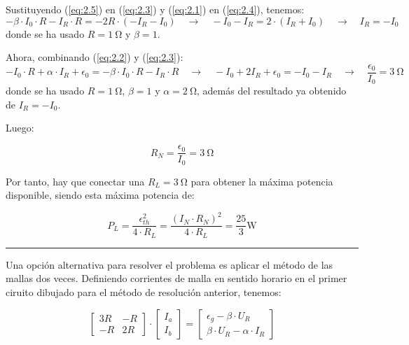 \vspace{5mm}
Sustituyendo (\ref{eq:2.5}) en (\ref{eq:2.3}) y (\ref{eq:2.1}) en (\ref{eq:2.4}), tenemos:
\[
    - \beta \cdot I_0 \cdot R - I_R \cdot R = -2R \cdot (-I_R -I_0) \quad \rightarrow \quad -I_0 -I_R = 2\cdot (I_R + I_0)  \quad \rightarrow \quad I_R = -I_0
\]
donde se ha usado $R=\qty{1}{\ohm}$ y $\beta = 1$.

\vspace{3mm}
Ahora, combinando (\ref{eq:2.2}) y (\ref{eq:2.3}):
\[
    -I_0 \cdot R + \alpha \cdot I_R + \epsilon_0 = - \beta \cdot I_0 \cdot R - I_R \cdot R \quad \rightarrow \quad -I_0 + 2 I_R + \epsilon_0 = -I_0 -I_R \quad \rightarrow \quad \frac{\epsilon_0}{I_0} = \qty{3}{\ohm}
\]
donde se ha usado $R=\qty{1}{\ohm}$, $\beta = 1$ y $\alpha=\qty{2}{\ohm}$, además del resultado ya obtenido de $I_R = -I_0$.

\vspace{3mm}
Luego: 

\vspace{-3mm}
\begin{equation*}
    R_N = \frac{\epsilon_0}{I_0} = \boxed{\qty{3}{\ohm}}
\end{equation*}
  
\vspace{2mm}
Por tanto, hay que conectar una $\boxed{R_L = \qty{3}{\ohm}}$ para obtener la máxima potencia disponible, siendo esta máxima potencia de:

\vspace{-2mm}
\begin{equation*}
    P_L = \frac{\epsilon_{th}^2}{4\cdot R_L} = \frac{(I_N \cdot R_N)^2}{4\cdot R_L} = \boxed{\frac{25}{3}\si{\watt}}
\end{equation*}

\vspace{3mm}
\noindent\rule{0.15\textwidth}{0.5pt}

\vspace{5mm}
Una opción alternativa para resolver el problema es aplicar el método de las mallas dos veces. Definiendo corrientes de malla en sentido horario en el primer ciruito dibujado para el método de resolución anterior, tenemos:

\vspace{-2mm}
\begin{equation*}
  \begin{bmatrix}
    3R & -R\\[4pt]
    -R & 2R
  \end{bmatrix} \cdot %
  \begin{bmatrix}
    I_a\\[4pt]
    I_b
  \end{bmatrix} = %
  \begin{bmatrix}
    \epsilon_g - \beta \cdot U_R\\[4pt]
    \beta \cdot U_R - \alpha \cdot I_R
  \end{bmatrix}
\end{equation*}

